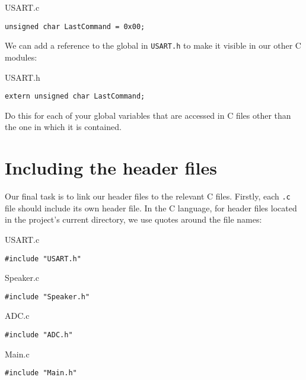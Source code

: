 \documentclass[a4paper,oneside,notitlepage]{article}
\begin{document}
USART.c
\begin{center}
\begin{lstlisting}
unsigned char LastCommand = 0x00;
\end{lstlisting}
\end{center}

We can add a reference to the global in \texttt{USART.h} to make it visible in our other C modules:

USART.h
\begin{center}
\begin{lstlisting}
extern unsigned char LastCommand;
\end{lstlisting}
\end{center}

Do this for each of your global variables that are accessed in C files other than the one in which it is contained.

\section{Including the header files}

Our final task is to link our header files to the relevant C files. Firstly, each \texttt{.c} file should include its own header file. In the C language, for header files located in the project's current directory, we use quotes around the file names:

USART.c
\begin{center}
\begin{lstlisting}
#include "USART.h"
\end{lstlisting}
\end{center}

Speaker.c
\begin{center}
\begin{lstlisting}
#include "Speaker.h"
\end{lstlisting}
\end{center}

ADC.c
\begin{center}
\begin{lstlisting}
#include "ADC.h"
\end{lstlisting}
\end{center}

Main.c
\begin{center}
\begin{lstlisting}
#include "Main.h"
\end{lstlisting}
\end{center}
\end{document}
